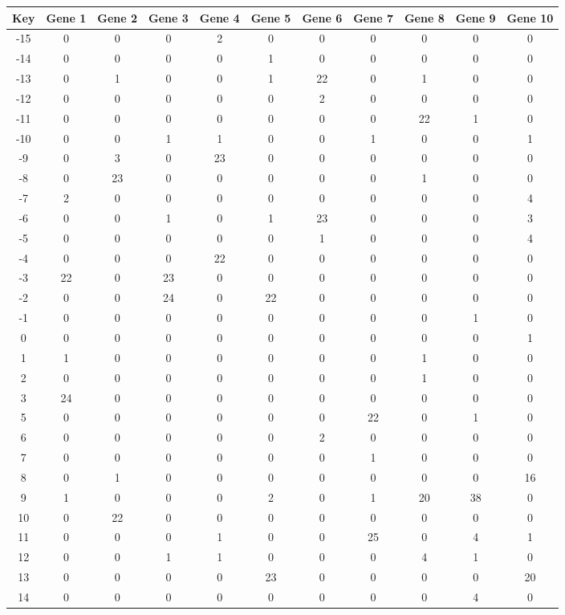 \begin{tabular}{|c|c|c|c|c|c|c|c|c|c|c|}
\hline
Key & Gene 1 & Gene 2 & Gene 3 & Gene 4 & Gene 5 & Gene 6 & Gene 7 & Gene 8 & Gene 9 & Gene 10 \\
\hline
-15 & 0 & 0 & 0 & 2 & 0 & 0 & 0 & 0 & 0 & 0 \\
-14 & 0 & 0 & 0 & 0 & 1 & 0 & 0 & 0 & 0 & 0 \\
-13 & 0 & 1 & 0 & 0 & 1 & 22 & 0 & 1 & 0 & 0 \\
-12 & 0 & 0 & 0 & 0 & 0 & 2 & 0 & 0 & 0 & 0 \\
-11 & 0 & 0 & 0 & 0 & 0 & 0 & 0 & 22 & 1 & 0 \\
-10 & 0 & 0 & 1 & 1 & 0 & 0 & 1 & 0 & 0 & 1 \\
-9 & 0 & 3 & 0 & 23 & 0 & 0 & 0 & 0 & 0 & 0 \\
-8 & 0 & 23 & 0 & 0 & 0 & 0 & 0 & 1 & 0 & 0 \\
-7 & 2 & 0 & 0 & 0 & 0 & 0 & 0 & 0 & 0 & 4 \\
-6 & 0 & 0 & 1 & 0 & 1 & 23 & 0 & 0 & 0 & 3 \\
-5 & 0 & 0 & 0 & 0 & 0 & 1 & 0 & 0 & 0 & 4 \\
-4 & 0 & 0 & 0 & 22 & 0 & 0 & 0 & 0 & 0 & 0 \\
-3 & 22 & 0 & 23 & 0 & 0 & 0 & 0 & 0 & 0 & 0 \\
-2 & 0 & 0 & 24 & 0 & 22 & 0 & 0 & 0 & 0 & 0 \\
-1 & 0 & 0 & 0 & 0 & 0 & 0 & 0 & 0 & 1 & 0 \\
0 & 0 & 0 & 0 & 0 & 0 & 0 & 0 & 0 & 0 & 1 \\
1 & 1 & 0 & 0 & 0 & 0 & 0 & 0 & 1 & 0 & 0 \\
2 & 0 & 0 & 0 & 0 & 0 & 0 & 0 & 1 & 0 & 0 \\
3 & 24 & 0 & 0 & 0 & 0 & 0 & 0 & 0 & 0 & 0 \\
5 & 0 & 0 & 0 & 0 & 0 & 0 & 22 & 0 & 1 & 0 \\
6 & 0 & 0 & 0 & 0 & 0 & 2 & 0 & 0 & 0 & 0 \\
7 & 0 & 0 & 0 & 0 & 0 & 0 & 1 & 0 & 0 & 0 \\
8 & 0 & 1 & 0 & 0 & 0 & 0 & 0 & 0 & 0 & 16 \\
9 & 1 & 0 & 0 & 0 & 2 & 0 & 1 & 20 & 38 & 0 \\
10 & 0 & 22 & 0 & 0 & 0 & 0 & 0 & 0 & 0 & 0 \\
11 & 0 & 0 & 0 & 1 & 0 & 0 & 25 & 0 & 4 & 1 \\
12 & 0 & 0 & 1 & 1 & 0 & 0 & 0 & 4 & 1 & 0 \\
13 & 0 & 0 & 0 & 0 & 23 & 0 & 0 & 0 & 0 & 20 \\
14 & 0 & 0 & 0 & 0 & 0 & 0 & 0 & 0 & 4 & 0 \\
\hline
\end{tabular}